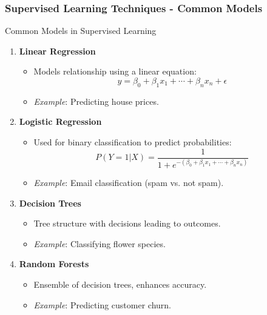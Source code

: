 \documentclass[aspectratio=169]{beamer}
\begin{document}
\begin{frame}[fragile]
    \frametitle{Supervised Learning Techniques - Common Models}
    \begin{block}{Common Models in Supervised Learning}
        \begin{enumerate}
            \item \textbf{Linear Regression}
                \begin{itemize}
                    \item Models relationship using a linear equation: 
                    \begin{equation} 
                        y = \beta_0 + \beta_1 x_1 + \cdots + \beta_n x_n + \epsilon 
                    \end{equation}
                    \item \textit{Example}: Predicting house prices.
                \end{itemize}
                
            \item \textbf{Logistic Regression}
                \begin{itemize}
                    \item Used for binary classification to predict probabilities: 
                    \begin{equation} 
                        P(Y=1|X) = \frac{1}{1 + e^{-(\beta_0 + \beta_1 x_1 + \cdots + \beta_n x_n)}} 
                    \end{equation}
                    \item \textit{Example}: Email classification (spam vs. not spam).
                \end{itemize}
                
            \item \textbf{Decision Trees}
                \begin{itemize}
                    \item Tree structure with decisions leading to outcomes.
                    \item \textit{Example}: Classifying flower species.
                \end{itemize}
                
            \item \textbf{Random Forests}
                \begin{itemize}
                    \item Ensemble of decision trees, enhances accuracy.
                    \item \textit{Example}: Predicting customer churn.
                \end{itemize}
                

\end{enumerate}
\end{block}
\end{frame}
\end{document}
